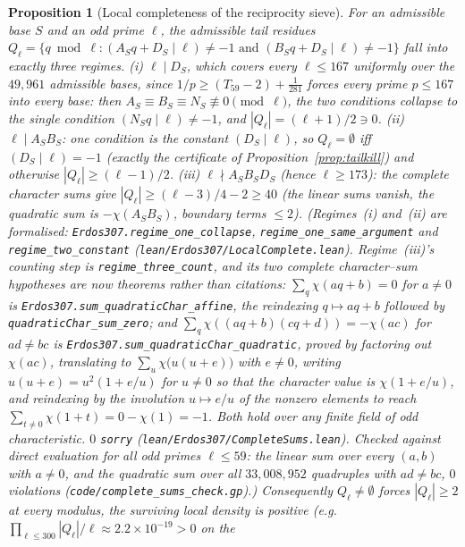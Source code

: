 \documentclass[11pt]{article}
\newtheorem{proposition}[theorem]{Proposition}
\theoremstyle{definition}
\begin{document}
\begin{proposition}[Local completeness of the reciprocity sieve]\label{prop:localcomplete}
For an admissible base $S$ and an odd prime $\ell$, the admissible tail residues
$Q_\ell=\{q\bmod\ell:(A_Sq+D_S\mid\ell)\ne-1\text{ and }(B_Sq+D_S\mid\ell)\ne-1\}$ fall into exactly three
regimes. \textup{(i)} $\ell\mid D_S$, which covers every $\ell\le167$ uniformly over the $49{,}961$
admissible bases, since $1/p\ge(T_{59}-2)+\tfrac1{281}$ forces every prime $p\le167$ into every base:
then $A_S\equiv B_S\equiv N_S\not\equiv0\pmod\ell$, the two conditions collapse to the single condition
$(N_Sq\mid\ell)\ne-1$, and $|Q_\ell|=(\ell+1)/2\ni0$. \textup{(ii)} $\ell\mid A_SB_S$: one condition is
the constant $(D_S\mid\ell)$, so $Q_\ell=\emptyset$ iff $(D_S\mid\ell)=-1$ (exactly the certificate of
Proposition~\ref{prop:tailkill}) and otherwise $|Q_\ell|\ge(\ell-1)/2$. \textup{(iii)}
$\ell\nmid A_SB_SD_S$ (hence $\ell\ge173$): the complete character sums give
$|Q_\ell|\ge(\ell-3)/4-2\ge40$ (the linear sums vanish, the quadratic sum is $-\chi(A_SB_S)$, boundary
terms $\le2$). \textup{(}Regimes~\textup{(i)} and~\textup{(ii)} are formalised:
\texttt{Erdos307.regime\_one\_collapse}, \texttt{regime\_one\_same\_argument} and
\texttt{regime\_two\_constant} \textup{(}\texttt{lean/Erdos307/LocalComplete.lean}\textup{)}.
Regime~\textup{(iii)}'s counting step is \texttt{regime\_three\_count}, and its two complete
character--sum hypotheses are now theorems rather than citations:
$\sum_q\chi(aq+b)=0$ for $a\ne0$ is \texttt{Erdos307.sum\_quadraticChar\_affine}, the reindexing
$q\mapsto aq+b$ followed by \texttt{quadraticChar\_sum\_zero}; and
$\sum_q\chi((aq+b)(cq+d))=-\chi(ac)$ for $ad\ne bc$ is
\texttt{Erdos307.sum\_quadraticChar\_quadratic}, proved by factoring out $\chi(ac)$, translating to
$\sum_u\chi\bigl(u(u+e)\bigr)$ with $e\ne0$, writing $u(u+e)=u^2(1+e/u)$ for $u\ne0$ so that the
character value is $\chi(1+e/u)$, and reindexing by the involution $u\mapsto e/u$ of the nonzero
elements to reach $\sum_{t\ne0}\chi(1+t)=0-\chi(1)=-1$. Both hold over any finite field of odd
characteristic. $0$ \texttt{sorry}
\textup{(\texttt{lean/Erdos307/CompleteSums.lean})}. Checked against direct evaluation for all odd
primes $\ell\le59$: the linear sum over every $(a,b)$ with $a\ne0$, and the quadratic sum over all
$33{,}008{,}952$ quadruples with $ad\ne bc$, $0$ violations
\textup{(\texttt{code/complete\_sums\_check.gp})}.\textup{)}
Consequently $Q_\ell\ne\emptyset$ forces $|Q_\ell|\ge2$ at every modulus, the surviving
local density is positive (e.g.\ $\prod_{\ell\le300}|Q_\ell|/\ell\approx2.2\times10^{-19}>0$ on the

\end{proposition}
\end{document}
